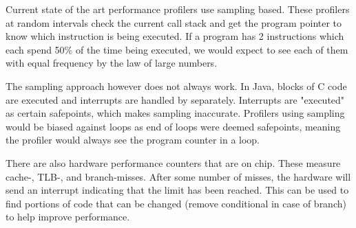 \documentclass[10pt]{article}
\begin{document}
Current state of the art performance profilers use sampling based. 
These profilers at random intervals check the current call stack and get the program pointer to know which instruction is being executed. 
If a program has 2 instructions which each spend 50\% of the time being executed, we would expect to see each of them with equal frequency by the law of large numbers.

The sampling approach however does not always work. In Java, blocks of C code are executed and interrupts are handled by separately. Interrupts are "executed" as certain safepoints, which makes sampling inaccurate. Profilers using sampling would be biased against loops as end of loops were deemed safepoints, meaning the profiler would always see the program counter in a loop. 

There are also hardware performance counters that are on chip. These measure cache-, TLB-, and branch-misses. After some number of misses, the hardware will send an interrupt indicating that the limit has been reached. This can be used to find portions of code that can be changed (remove conditional in case of branch) to help improve performance. \\
\end{document}
